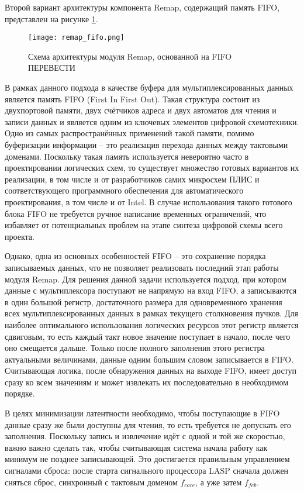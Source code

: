 Второй вариант архитектуры компонента Remap, содержащий память FIFO, представлен на рисунке \ref{fig:remap_fifo}.\par
\begin{figure}[ht]
    \centering
    \texttt{[image: remap\_fifo.png]}
    \caption{Схема архитектуры модуля Remap, основанной на FIFO ПЕРЕВЕСТИ}
    \label{fig:remap_fifo}
\end{figure}\par
В рамках данного подхода в качестве буфера для мультиплексированных данных является память FIFO (First In First Out). Такая структура состоит из двухпортовой памяти, двух счётчиков адреса и двух автоматов для чтения и записи данных и является одним из ключевых элементов цифровой схемотехники. Одно из самых распространённых применений такой памяти, помимо буферизации информации -- это реализация перехода данных между тактовыми доменами. Поскольку такая память используется невероятно часто в проектировании логических схем, то существует множество готовых вариантов их реализации, в том числе и от разработчиков самих микросхем ПЛИС и соответствующего программного обеспечения для автоматического проектирования, в том числе и от Intel. В случае использования такого готового блока FIFO не требуется ручное написание временных ограничений, что избавляет от потенциальных проблем на этапе синтеза цифровой схемы всего проекта.\par
Однако, одна из основных особенностей FIFO -- это сохранение порядка записываемых данных, что не позволяет реализовать последний этап работы модуля Remap. Для решения данной задачи используется подход, при котором данные с мультиплексора поступают не напрямую на вход FIFO, а записываются в один большой регистр, достаточного размера для одновременного хранения всех мультиплексированных данных в рамках текущего столкновения пучков. Для наиболее оптимального использования логических ресурсов этот регистр является сдвиговым, то есть каждый такт новое значение поступает в начало, после чего оно смещается дальше. Только после полного заполнения этого регистра актуальными величинами, данные одним большим словом записывается в FIFO. Считывающая логика, после обнаружения данных на выходе FIFO, имеет доступ сразу ко всем значениям и может извлекать их последовательно в необходимом порядке.\par
В целях минимизации латентности необходимо, чтобы поступающие в FIFO данные сразу же были доступны для чтения, то есть требуется не допускать его заполнения. Поскольку запись и извлечение идёт с одной и той же скоростью, важно важно сделать так, чтобы считывающая система начала работу как минимум не позднее записывающей. Это достигается правильным управлением сигналами сброса: после старта сигнального процессора LASP сначала должен сняться сброс, синхронный с тактовым доменом $f_{core}$, а уже затем $f_{feb}$.\par

